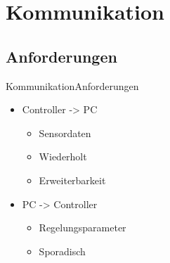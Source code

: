\section{Kommunikation}
\subsection{Anforderungen}
\begin{frame}{Kommunikation}{Anforderungen}
  \begin{itemize}
    \item Controller -> PC
    \begin{itemize}
    \item Sensordaten
    \item Wiederholt
    \item Erweiterbarkeit
    \end{itemize}
    \item PC -> Controller
    \begin{itemize}
      \item Regelungsparameter
      \item Sporadisch
    \end{itemize}
  \end{itemize}
\end{frame}
